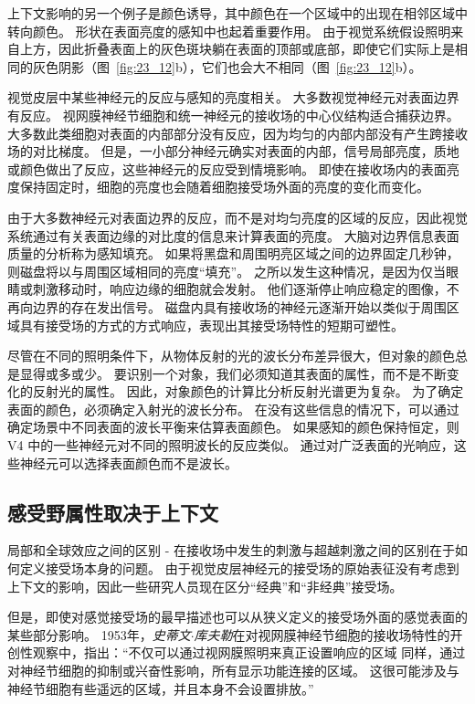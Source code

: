 上下文影响的另一个例子是颜色诱导，其中颜色在一个区域中的出现在相邻区域中转向颜色。
形状在表面亮度的感知中也起着重要作用。
由于视觉系统假设照明来自上方，因此折叠表面上的灰色斑块躺在表面的顶部或底部，即使它们实际上是相同的灰色阴影（图~\ref{fig:23_12}b），它们也会大不相同（图~\ref{fig:23_12}b）。


视觉皮层中某些神经元的反应与感知的亮度相关。
大多数视觉神经元对表面边界有反应。
视网膜神经节细胞和统一神经元的接收场的中心仪结构适合捕获边界。
大多数此类细胞对表面的内部部分没有反应，因为均匀的内部内部没有产生跨接收场的对比梯度。
但是，一小部分神经元确实对表面的内部，信号局部亮度，质地或颜色做出了反应，这些神经元的反应受到情境影响。
即使在接收场内的表面亮度保持固定时，细胞的亮度也会随着细胞接受场外面的亮度的变化而变化。


由于大多数神经元对表面边界的反应，而不是对均匀亮度的区域的反应，因此视觉系统通过有关表面边缘的对比度的信息来计算表面的亮度。
大脑对边界信息表面质量的分析称为感知填充。
如果将黑盘和周围明亮区域之间的边界固定几秒钟，则磁盘将以与周围区域相同的亮度“填充”。
之所以发生这种情况，是因为仅当眼睛或刺激移动时，响应边缘的细胞就会发射。
他们逐渐停止响应稳定的图像，不再向边界的存在发出信号。
磁盘内具有接收场的神经元逐渐开始以类似于周围区域具有接受场的方式的方式响应，表现出其接受场特性的短期可塑性。


尽管在不同的照明条件下，从物体反射的光的波长分布差异很大，但对象的颜色总是显得或多或少。
要识别一个对象，我们必须知道其表面的属性，而不是不断变化的反射光的属性。
因此，对象颜色的计算比分析反射光谱更为复杂。
为了确定表面的颜色，必须确定入射光的波长分布。
在没有这些信息的情况下，可以通过确定场景中不同表面的波长平衡来估算表面颜色。
如果感知的颜色保持恒定，则 V4 中的一些神经元对不同的照明波长的反应类似。
通过对广泛表面的光响应，这些神经元可以选择表面颜色而不是波长。



\subsection{感受野属性取决于上下文}

局部和全球效应之间的区别 - 在接收场中发生的刺激与超越刺激之间的区别在于如何定义接受场本身的问题。
由于视觉皮层神经元的接受场的原始表征没有考虑到上下文的影响，因此一些研究人员现在区分“经典”和“非经典”接受场。


但是，即使对感觉接受场的最早描述也可以从狭义定义的接受场外面的感觉表面的某些部分影响。
1953年，\textit{史蒂文$\cdot$库夫勒}在对视网膜神经节细胞的接收场特性的开创性观察中，指出：“不仅可以通过视网膜照明来真正设置响应的区域 同样，通过对神经节细胞的抑制或兴奋性影响，所有显示功能连接的区域。
这很可能涉及与神经节细胞有些遥远的区域，并且本身不会设置排放。”


